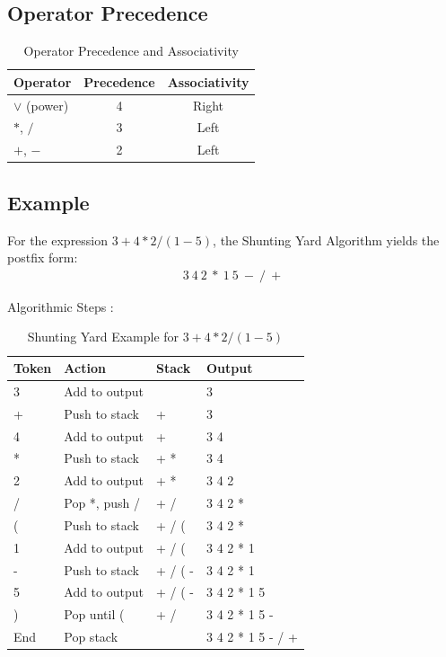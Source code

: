 \documentclass[conference]{IEEEtran}
\begin{document}
\subsection{Operator Precedence}
\begin{table}[htbp]
\centering
\caption{Operator Precedence and Associativity}
\label{tab:precedence}
\begin{tabular}{lcc}
\toprule
\textbf{Operator} & \textbf{Precedence} & \textbf{Associativity} \\
\midrule
$\vee$ (power) & 4 & Right \\
$*$, $/$ & 3 & Left \\
$+$, $-$ & 2 & Left \\
\bottomrule
\end{tabular}
\end{table}
\subsection{Example}
For the expression $3 + 4 * 2 / (1 - 5)$, the Shunting Yard Algorithm yields the postfix form:
\begin{align}
3 \ 4 \ 2 \ * \ 1 \ 5 \ - \ / \ +
\end{align}

Algorithmic Steps :

\begin{table}[htbp]
\centering
\caption{Shunting Yard Example for $3 + 4 * 2 / (1 - 5)$}
\label{tab:example}
\begin{tabular}{llll}
\toprule
\textbf{Token} & \textbf{Action} & \textbf{Stack} & \textbf{Output} \\
\midrule
3 & Add to output &  & 3 \\
+ & Push to stack & + & 3 \\
4 & Add to output & + & 3 4 \\
* & Push to stack & + * & 3 4 \\
2 & Add to output & + * & 3 4 2 \\
/ & Pop *, push / & + / & 3 4 2 * \\
( & Push to stack & + / ( & 3 4 2 * \\
1 & Add to output & + / ( & 3 4 2 * 1 \\
- & Push to stack & + / ( - & 3 4 2 * 1 \\
5 & Add to output & + / ( - & 3 4 2 * 1 5 \\
) & Pop until ( & + / & 3 4 2 * 1 5 - \\
End & Pop stack &  & 3 4 2 * 1 5 - / + \\
\bottomrule
\end{tabular}
\end{table}
\end{document}
